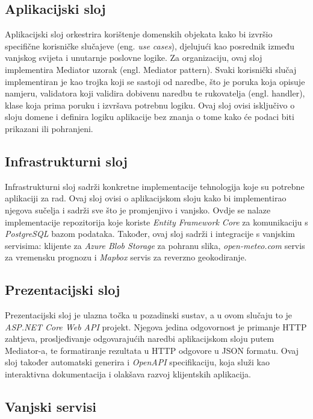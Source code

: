 \subsection{Aplikacijski sloj}

Aplikacijski sloj orkestrira korištenje domenskih objekata kako bi izvršio specifične korisničke slučajeve (eng. \textit {use cases}), djelujući kao posrednik između vanjskog svijeta i unutarnje poslovne logike. Za organizaciju, ovaj sloj implementira Mediator uzorak (engl. Mediator pattern). Svaki korisnički slučaj implementiran je kao trojka koji se sastoji od naredbe, što je poruka koja opisuje namjeru, validatora koji validira dobivenu naredbu te rukovatelja (engl. handler), klase koja prima poruku i izvršava potrebnu logiku. Ovaj sloj ovisi isključivo o sloju domene i definira logiku aplikacije bez znanja o tome kako će podaci biti prikazani ili pohranjeni.


\subsection{Infrastrukturni sloj}

Infrastrukturni sloj sadrži konkretne implementacije tehnologija koje su potrebne aplikaciji za rad. Ovaj sloj ovisi o aplikacijskom sloju kako bi implementirao njegova sučelja i sadrži sve što je promjenjivo i vanjsko. Ovdje se nalaze implementacije repozitorija koje koriste \textit{Entity Framework Core} za komunikaciju s \textit{PostgreSQL} bazom podataka. Također, ovaj sloj sadrži i integracije s vanjskim servisima: klijente za \textit{Azure Blob Storage} za pohranu slika, \textit{open-meteo.com} servis za vremensku prognozu i \textit{Mapbox} servis za reverzno geokodiranje.

\subsection{Prezentacijski sloj}

Prezentacijski sloj je ulazna točka u pozadinski sustav, a u ovom slučaju to je \textit{ASP.NET Core Web API} projekt. Njegova jedina odgovornost je primanje HTTP zahtjeva, prosljeđivanje odgovarajućih naredbi aplikacijskom sloju putem Mediator-a, te formatiranje rezultata u HTTP odgovore u JSON formatu. Ovaj sloj također automatski generira i \textit{OpenAPI} specifikaciju, koja služi kao interaktivna dokumentacija i olakšava razvoj klijentskih aplikacija.


\subsection{Vanjski servisi}

